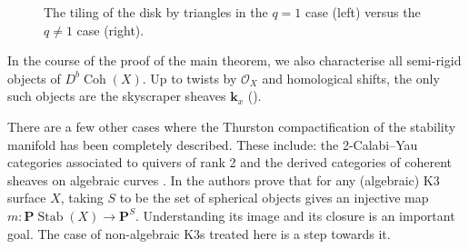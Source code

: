 \documentclass{amsart}
\begin{document}
  \begin{figure}[ht]
    \centering
    \caption{The tiling of the disk by triangles in the \(q = 1\) case (left) versus the \(q \neq 1\) case (right).}
    \label{fig:upper-half-plane}
  \end{figure}
  
  
In the course of the proof of the main theorem, we also characterise all semi-rigid objects of \(D^b \operatorname{Coh} (X)\).
Up to twists by \(\mathcal{O}_X\) and homological shifts, the only such objects are the skyscraper sheaves \(\mathbf{k}_x\) ().

There are a few other cases where the Thurston compactification of the stability manifold has been completely described.
These include: the 2-Calabi--Yau categories associated to quivers of rank 2 \cite{bap.deo.lic:20} and the derived categories of coherent sheaves on algebraic curves \cite{kik.kos.ouc:24}.
In \cite{kik.kos.ouc:25} the authors prove that for any (algebraic) K3 surface \(X\), taking \(S\) to be the set of spherical objects gives an injective map \(m \colon \mathbf{P} \operatorname{Stab}(X) \to \mathbf{P}^S\).
Understanding its image and its closure is an important goal.
The case of non-algebraic K3s treated here is a step towards it.
\end{document}
